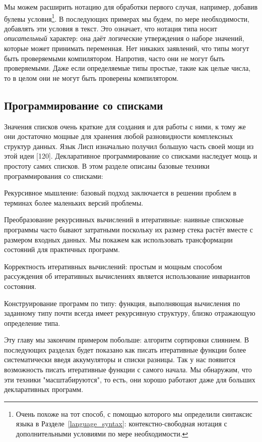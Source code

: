 Мы можем расширить нотацию для обработки первого случая, например, добавив булевы условия\footnote{Очень похоже на тот способ, с помощью которого мы определили синтаксис языка в Разделе~\ref{language_syntax}: контекстно-свободная нотация с дополнительными условиями по мере необходимости.}. В последующих примерах мы будем, по мере необходимости, добавлять эти условия в текст.  Это означает, что нотация типа носит \emph{описательный} характер: она даёт логические утверждения о наборе значений, которые может принимать переменная. Нет никаких заявлений, что типы могут быть проверяемыми компилятором. Напротив, часто они не могут быть проверяемыми. Даже если определяемые типы простые, такие как целые числа, то в целом они не могут быть проверены компилятором.

\subsection{Программирование со списками}

Значения списков очень краткие для создания и для работы с ними, к тому же они достаточно мощные для хранения любой разновидности комплексных структур данных. Язык Лисп изначально получил большую часть своей мощи из этой идеи [120]. Декларативное программирование со списками наследует мощь и простоту самих списков. В этом разделе описаны базовые техники программирования со списками:

Рекурсивное мышление: базовый подход заключается в решении проблем в терминах более маленьких версий проблемы.

Преобразование рекурсивных вычислений в итеративные: наивные списковые программы часто бывают затратными поскольку их размер стека растёт вместе с размером входных данных. Мы покажем как использовать трансформации состояний для практичных программ.

Корректность итеративных вычислений: простым и мощным способом рассуждения об итеративных вычислениях является использование инвариантов состояния.

Конструирование программ по типу: функция, выполняющая вычисления по заданному типу почти всегда имеет рекурсивную структуру, близко отражающую определение типа.

Эту главу мы закончим примером побольше: алгоритм сортировки слиянием. В последующих разделах будет показано как писать итеративные функции более систематически введя аккумуляторы и списки разницы. Так у нас появится возможность писать итеративные функции с самого начала. Мы обнаружим, что эти техники "масштабируются", то есть, они хорошо работают даже для больших декларативных программ.

